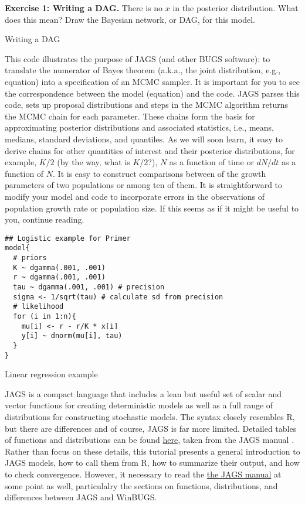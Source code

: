 \documentclass[12pt,english]{article}
\begin{document}
\bigskip
\belowcaptionskip=-40pt
\begin{exercise}
\begin{mdframed}
\doublespacing
\textbf{Exercise 1: Writing a DAG.} There is no $x$ in the posterior distribution. What does this mean? Draw the Bayesian network, or DAG, for this model.
\end{mdframed}
\captionsetup{textformat=empty, labelformat=empty}
\caption{Writing a DAG}
\label{ex:DAG}
\end{exercise}
\belowcaptionskip=0pt

This code illustrates the purpose of JAGS (and other BUGS software): to translate the numerator of Bayes theorem (a.k.a., the joint distribution, e.g., equation) into a specification of an MCMC sampler. It is important for you to see the correspondence between the model (equation) and the code. JAGS parses this code, sets up proposal distributions and steps in the MCMC algorithm returns the MCMC chain for each parameter. These chains form the basis for approximating posterior distributions and associated statistics, i.e., means, medians, standard deviations, and quantiles. As we will soon learn, it easy to derive chains for other quantities of interest and their posterior distributions, for example, $K/2$ (by the way, what is $K/2$?), $N$ as a function of time or $dN/dt$ as a function of $N$. It is easy to construct comparisons between of the growth parameters of two populations or among ten of them. It is straightforward to modify your model and code to incorporate errors in the observations of population growth rate or population size. If this seems as if it might be useful to you, continue reading. 

\begin{algorithm}
\begin{Verbatim}[frame=single]
## Logistic example for Primer
model{
  # priors
  K ~ dgamma(.001, .001)
  r ~ dgamma(.001, .001)
  tau ~ dgamma(.001, .001) # precision
  sigma <- 1/sqrt(tau) # calculate sd from precision
  # likelihood
  for (i in 1:n){
    mu[i] <- r - r/K * x[i]
    y[i] ~ dnorm(mu[i], tau)
  }
}
\end{Verbatim}
\caption{Linear regression example}
\label{alg:Linear regression example}
\end{algorithm}

JAGS is a compact language that includes a lean but useful set of scalar and vector functions for creating deterministic models as well as a full range of distributions for constructing stochastic models. The syntax closely resembles R, but there are differences and of course, JAGS is far more limited. Detailed tables of functions and distributions can be found \href{JAGSUserManualPages.pdf}{here}, taken from the JAGS manual \citep{Plummer_mannual}. Rather than focus on these details, this tutorial presents a general introduction to JAGS models, how to call them from R, how to summarize their output, and how to check convergence. However, it necessary to read the \href{https://sourceforge.net/projects/mcmc-jags/files/Manuals/4.x/}{the JAGS manual} at some point as well, particulalry the sections on functions, distributions, and differences between JAGS and WinBUGS.
\end{document}
